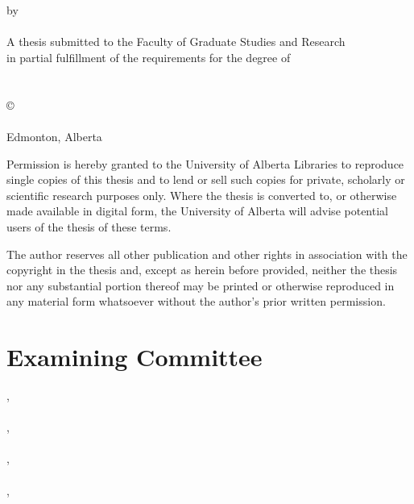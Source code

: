 
  \begin{center}
    \Large{\textbf{\school}}  \\ [.6in]
    \Large{\textbf{\thesistitle}} \\ [.1in]
    \normalsize{by} \\ [.1in]
    \Large{\textbf{\name}}  \\ [.6in]
    \normalsize{A thesis submitted to the Faculty of Graduate Studies and Research \\
    in partial fulfillment of the requirements for the degree of} \\ [0.1in]
    \Large{\textbf{\program}} \\ [.1in]
    \normalsize{\dept} \\ [0.6in]
    \scriptsize{\copyright\:\name} \\
    \scriptsize{\semester} \\
    \scriptsize{Edmonton, Alberta} \\ [0.6in]
    \scriptsize{Permission is hereby granted to the University of Alberta Libraries to reproduce single copies of this thesis and to lend or sell such copies for private, scholarly or scientific research purposes only. Where the thesis is converted to, or otherwise made available in digital form, the University of Alberta will advise potential users of the thesis of these terms.

The author reserves all other publication and other rights in association with the copyright in the thesis and, except as herein before provided, neither the thesis nor any substantial portion thereof may be printed or otherwise reproduced in any material form whatsoever without the author's prior written permission.}
  \end{center}

  \newpage
  \chapter*{Examining Committee}
  \thispagestyle{empty}
     \supervisor, \; \superloc \\ \\
     \coma, \; \loca \\ \\
     \comb, \; \locb \\ \\
     \comc, \; \locc


